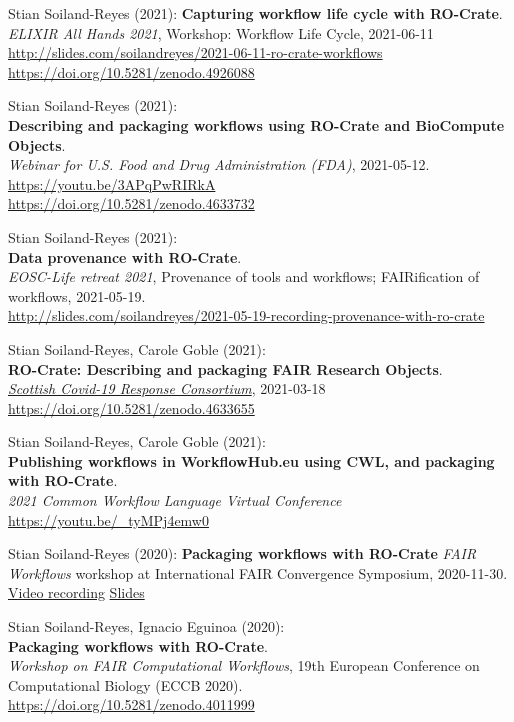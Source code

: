 Stian Soiland-Reyes (2021):
\textbf{Capturing workflow life cycle with RO-Crate}.\\
\emph{ELIXIR All Hands 2021}, Workshop: Workflow Life Cycle, 2021-06-11\\
\url{http://slides.com/soilandreyes/2021-06-11-ro-crate-workflows}
\url{https://doi.org/10.5281/zenodo.4926088}

Stian Soiland-Reyes (2021):\\
\textbf{Describing and packaging workflows using RO-Crate and BioCompute Objects}.\\
\emph{Webinar for U.S. Food and Drug Administration (FDA)}, 2021-05-12.
\url{https://youtu.be/3APqPwRIRkA} \\
\url{https://doi.org/10.5281/zenodo.4633732}

Stian Soiland-Reyes (2021):\\
{\textbf{Data provenance with RO-Crate}}.\\
\emph{EOSC-Life retreat 2021}, Provenance of tools and workflows;
FAIRification of workflows, 2021-05-19.\\
\url{http://slides.com/soilandreyes/2021-05-19-recording-provenance-with-ro-crate}

Stian Soiland-Reyes, Carole Goble (2021):\\
\textbf{RO-Crate: Describing and packaging FAIR Research Objects}.\\
\emph{\href{https://www.gla.ac.uk/research/az/scrc/}{Scottish Covid-19
Response Consortium}}, 2021-03-18
\url{https://doi.org/10.5281/zenodo.4633655}

Stian Soiland-Reyes, Carole Goble (2021):\\
{\textbf{Publishing workflows in WorkflowHub.eu using CWL, and packaging with RO-Crate}}.\\
\emph{2021 Common Workflow Language Virtual Conference}\\
\url{https://youtu.be/_tyMPj4emw0}

Stian Soiland-Reyes (2020):
\textbf{Packaging workflows with RO-Crate} 
\emph{FAIR Workflows} workshop at
{International FAIR Convergence Symposium}, 2020-11-30.
\href{https://vimeo.com/499270810}{Video recording}
\href{https://drive.google.com/file/d/1lYAdqm7RESqA9zplTXd4JFJUmome66ui}{Slides}

Stian Soiland-Reyes, Ignacio Eguinoa (2020):\\
\textbf{Packaging workflows with RO-Crate}.\\
{\emph{Workshop on FAIR Computational Workflows}}, 19th European Conference on
Computational Biology
({ECCB 2020}).\\
\url{https://doi.org/10.5281/zenodo.4011999}

